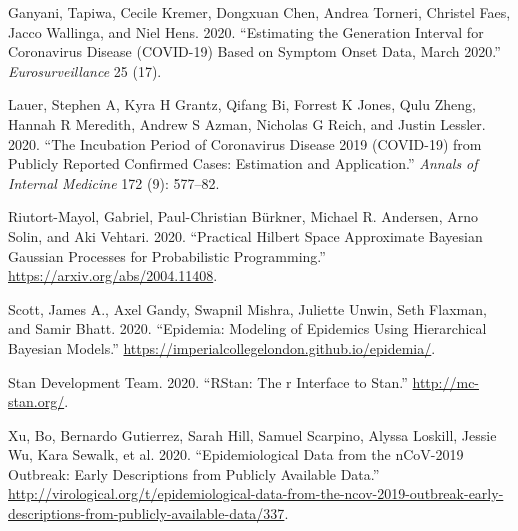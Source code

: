 \leavevmode{}%
Ganyani, Tapiwa, Cecile Kremer, Dongxuan Chen, Andrea Torneri, Christel Faes, Jacco Wallinga, and Niel Hens. 2020. {``Estimating the Generation Interval for Coronavirus Disease (COVID-19) Based on Symptom Onset Data, March 2020.''} \emph{Eurosurveillance} 25 (17).

\leavevmode{}%
Lauer, Stephen A, Kyra H Grantz, Qifang Bi, Forrest K Jones, Qulu Zheng, Hannah R Meredith, Andrew S Azman, Nicholas G Reich, and Justin Lessler. 2020. {``The Incubation Period of Coronavirus Disease 2019 (COVID-19) from Publicly Reported Confirmed Cases: Estimation and Application.''} \emph{Annals of Internal Medicine} 172 (9): 577--82.

\leavevmode{}%
Riutort-Mayol, Gabriel, Paul-Christian Bürkner, Michael R. Andersen, Arno Solin, and Aki Vehtari. 2020. {``Practical Hilbert Space Approximate Bayesian Gaussian Processes for Probabilistic Programming.''} \url{https://arxiv.org/abs/2004.11408}.

\leavevmode{}%
Scott, James A., Axel Gandy, Swapnil Mishra, Juliette Unwin, Seth Flaxman, and Samir Bhatt. 2020. {``Epidemia: Modeling of Epidemics Using Hierarchical Bayesian Models.''} \url{https://imperialcollegelondon.github.io/epidemia/}.

\leavevmode{}%
Stan Development Team. 2020. {``RStan: The r Interface to Stan.''} \url{http://mc-stan.org/}.

\leavevmode{}%
Xu, Bo, Bernardo Gutierrez, Sarah Hill, Samuel Scarpino, Alyssa Loskill, Jessie Wu, Kara Sewalk, et al. 2020. {``Epidemiological Data from the nCoV-2019 Outbreak: Early Descriptions from Publicly Available Data.''} \url{http://virological.org/t/epidemiological-data-from-the-ncov-2019-outbreak-early-descriptions-from-publicly-available-data/337}.

% 
% 
